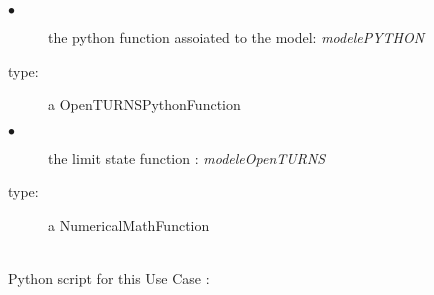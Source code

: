              {
               \begin{description}
               \item[$\bullet$] the python function assoiated to the model: {\itshape modelePYTHON}
               \item[type:] a OpenTURNSPythonFunction
               \item[$\bullet$] the limit state function : {\itshape modeleOpenTURNS}
               \item[type:] a NumericalMathFunction
               \end{description}
             }

             \textspace\\
             Python script for this Use Case :
